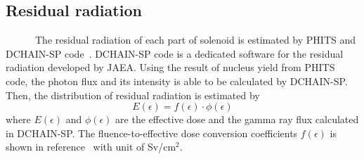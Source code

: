 
  \subsection{Residual radiation}
~~~~~~The residual radiation of each part of solenoid is estimated by PHITS and DCHAIN-SP code~\cite{dchain}.
DCHAIN-SP code is a dedicated software for the residual radiation developed by JAEA.
Using the result of nucleus yield from PHITS code, the photon flux and its intensity is able to be calculated by DCHAIN-SP.
Then, the distribution of residual radiation is estimated by
\begin{equation}
 E(\epsilon) = f(\epsilon) \cdot \phi(\epsilon)
\end{equation}
where $E(\epsilon)$ and $\phi(\epsilon)$ are the effective dose and the gamma ray flux calculated in DCHAIN-SP.
The fluence-to-effective dose conversion coefficients $f(\epsilon)$ is shown in reference~\cite{flco} with unit of Sv/cm$^2$.

